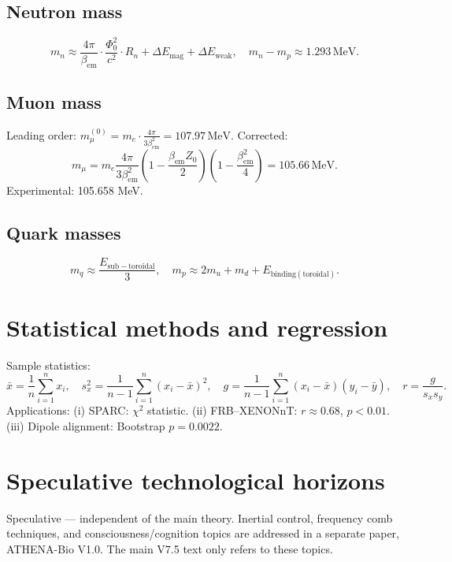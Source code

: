 \documentclass[11pt,a4paper]{article}
\begin{document}
\subsection{Neutron mass}
\label{subsec:mn}
\[
m_n \approx \frac{4\pi}{\beta_{\mathrm{em}}} \cdot \frac{\Phi_0^2}{c^2} \cdot R_n + \Delta E_{\mathrm{mag}} + \Delta E_{\mathrm{weak}}, \quad m_n - m_p \approx 1.293\,\mathrm{MeV}. \tag{48}
\]

\subsection{Muon mass}
\label{subsec:mmu}
Leading order: \(m^{(0)}_\mu = m_e \cdot \frac{4\pi}{3\beta_{\mathrm{em}}^2} = 107.97\,\mathrm{MeV}\). Corrected:
\[
m_\mu = m_e \frac{4\pi}{3\beta_{\mathrm{em}}^2} \left(1 - \frac{\beta_{\mathrm{em}} Z_0}{2}\right) \left(1 - \frac{\beta_{\mathrm{em}}^2}{4}\right) = 105.66\,\mathrm{MeV}. \tag{49}
\]
Experimental: 105.658 MeV.

\subsection{Quark masses}
\label{subsec:quarks}
\[
m_q \approx \frac{E_{\mathrm{sub-toroidal}}}{3}, \quad m_p \approx 2m_u + m_d + E_{\mathrm{binding(toroidal)}}. \tag{50}
\]

\section{Statistical methods and regression}
\label{sec:stats}
Sample statistics:
\[
\bar{x} = \frac{1}{n}\sum_{i=1}^n x_i,\quad s_x^2 = \frac{1}{n-1}\sum_{i=1}^n (x_i-\bar{x})^2,\quad g = \frac{1}{n-1}\sum_{i=1}^n (x_i-\bar{x})(y_i-\bar{y}),\quad r = \frac{g}{s_x s_y}. \tag{51}
\]
Applications: (i) SPARC: \(\chi^2\) statistic. (ii) FRB–XENONnT: \(r \approx 0.68\), \(p < 0.01\). (iii) Dipole alignment: Bootstrap \(p = 0.0022\).

\section{Speculative technological horizons}
\label{sec:speculative}
Speculative — independent of the main theory. Inertial control, frequency comb techniques, and consciousness/cognition topics are addressed in a separate paper, ATHENA-Bio V1.0. The main V7.5 text only refers to these topics.
\end{document}
